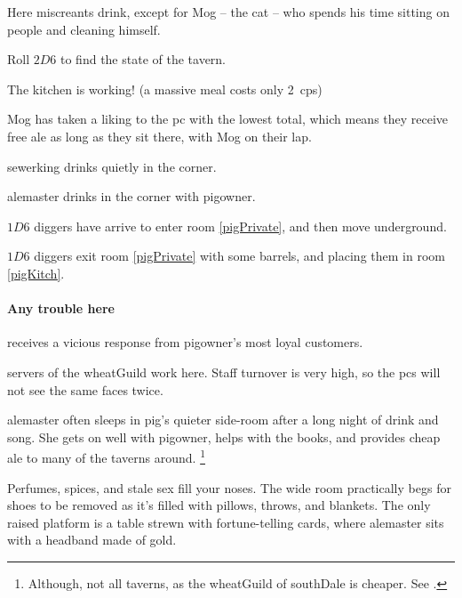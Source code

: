 
Here miscreants drink, except for Mog -- the cat -- who spends his time sitting on people and cleaning himself.

Roll $2D6$ to find the state of the tavern.

\begin{dlist}
  \item
  The kitchen is working!
  (a massive meal costs only 2~\glspl{cp})
  \item
  Mog has taken a liking to the \gls{pc} with the lowest  total, which means they receive free ale as long as they sit there, with Mog on their lap.
  \item
  \Gls{sewerking} drinks quietly in the corner.
  \item
  \Gls{alemaster} drinks in the corner with \gls{pigowner}.
  \item
  $1D6$ \glspl{digger} have arrive to enter room \vref{pigPrivate}, and then move underground.
  \item
  $1D6$ \glspl{digger} exit room \ref{pigPrivate} with some barrels, and placing them in room \vref{pigKitch}.
\end{dlist}

\paragraph{Any trouble here}
receives a vicious response from \gls{pigowner}'s most loyal customers.



\Glspl{server} of the \gls{wheatGuild} work here.
Staff turnover is very high, so the \glspl{pc} will not see the same faces twice.

\pigowner


\Gls{alemaster} often sleeps in \gls{pig}'s quieter side-room after a long night of drink and song.
She gets on well with \gls{pigowner}, helps with the books, and provides cheap ale to many of the taverns around.%
\footnote{Although, not all taverns, as the \gls{wheatGuild} of \gls{southDale} is cheaper.
See .}

\begin{boxtext}
  Perfumes, spices, and stale sex fill your noses.
  The wide room practically begs for shoes to be removed as it's filled with pillows, throws, and blankets.
  The only raised platform is a table strewn with fortune-telling cards, where \gls{alemaster} sits with a headband made of gold.
\end{boxtext}

